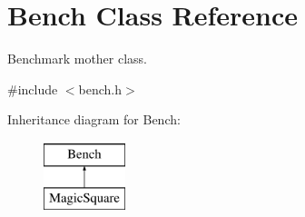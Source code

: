 \hypertarget{classBench}{\section{\-Bench \-Class \-Reference}
\label{classBench}
}


\-Benchmark mother class.  




{\ttfamily \#include $<$bench.\-h$>$}

\-Inheritance diagram for \-Bench\-:\begin{figure}[H]
\begin{center}
\leavevmode
\includegraphics[height=2.000000cm]{classBench}
\end{center}
\end{figure}
